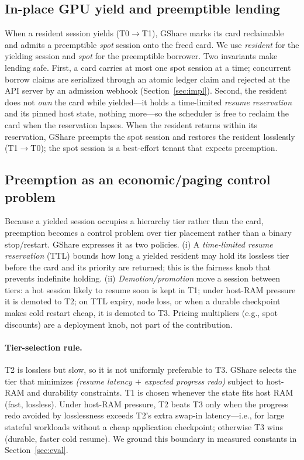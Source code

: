 \documentclass[preprint,12pt]{elsarticle}
\begin{document}
\subsection{In-place GPU yield and preemptible lending}
When a resident session yields (T0$\rightarrow$T1), GShare marks its card reclaimable and admits a
preemptible \emph{spot} session onto the freed card. We use \emph{resident} for the yielding session and
\emph{spot} for the preemptible borrower. Two invariants make lending safe. First, a card carries at most
one spot session at a time; concurrent borrow claims are serialized through an atomic ledger claim and
rejected at the API server by an admission webhook (Section~\ref{sec:impl}). Second, the resident does not
\emph{own} the card while yielded---it holds a time-limited \emph{resume reservation} and its pinned host
state, nothing more---so the scheduler is free to reclaim the card when the reservation lapses. When the
resident returns within its reservation, GShare preempts the spot session and restores the resident
losslessly (T1$\rightarrow$T0); the spot session is a best-effort tenant that expects preemption.

\subsection{Preemption as an economic/paging control problem}
\label{sec:policy}
Because a yielded session occupies a hierarchy tier rather than the card, preemption becomes a control
problem over tier placement rather than a binary stop/restart. GShare expresses it as two policies. (i) A
\emph{time-limited resume reservation} (TTL) bounds how long a yielded resident may hold its lossless tier
before the card and its priority are returned; this is the fairness knob that prevents indefinite holding.
(ii) \emph{Demotion/promotion} move a session between tiers: a hot session likely to resume soon is kept in
T1; under host-RAM pressure it is demoted to T2; on TTL expiry, node loss, or when a durable checkpoint
makes cold restart cheap, it is demoted to T3. Pricing multipliers (e.g., spot discounts) are a deployment
knob, not part of the contribution.

\paragraph{Tier-selection rule.}
T2 is lossless but slow, so it is not uniformly preferable to T3. GShare selects the tier that minimizes
\emph{(resume latency $+$ expected progress redo)} subject to host-RAM and durability constraints. T1 is
chosen whenever the state fits host RAM (fast, lossless). Under host-RAM pressure, T2 beats T3 only when the
progress redo avoided by losslessness exceeds T2's extra swap-in latency---i.e., for large stateful
workloads without a cheap application checkpoint; otherwise T3 wins (durable, faster cold resume). We
ground this boundary in measured constants in Section~\ref{sec:eval}.
\end{document}
